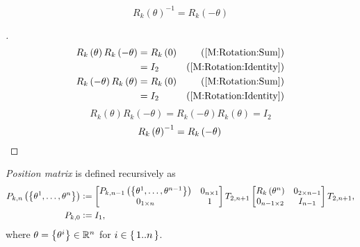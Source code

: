 \documentclass[../main.tex]{subfiles}
\begin{document}
\begin{corollary}\label{M:Rotation:Inverse}
    \begin{equation*}
        R_k\left(\theta\right)^{-1} = R_k\left(-\theta\right)
    \end{equation*}
\end{corollary}
\begin{proof}[]
    \begin{align*}
        R_k\left(\theta\right)R_k\left(-\theta\right)
         & = R_k\left(0\right) & \text{(\cref{M:Rotation:Sum})}      \\
         & = I_2               & \text{(\cref{M:Rotation:Identity})} \\
        R_k\left(-\theta\right)R_k\left(\theta\right)
         & = R_k\left(0\right) & \text{(\cref{M:Rotation:Sum})}      \\
         & = I_2               & \text{(\cref{M:Rotation:Identity})}
    \end{align*}
    \begin{equation*}
        R_k\left(\theta\right)R_k\left(-\theta\right)
        = R_k\left(-\theta\right)R_k\left(\theta\right)
        = I_2
    \end{equation*}
    \begin{equation*}
        {R_k\left(\theta\right)}^{-1}
        =
        R_k\left(-\theta\right)
        \qedhere
    \end{equation*}
\end{proof}
\begin{definition}\label{M:Position}
    \textit{Position matrix} is defined recursively as
    \begin{align*}
        P_{k,n}\left(\left\{\tensor{\theta}{^1},\dots,\tensor{\theta}{^n}\right\}\right) & \defeq
        \begin{bmatrix}
            P_{k,n-1}\left(\left\{\tensor{\theta}{^1},\dots,\tensor{\theta}{^{n-1}}\right\}\right) & 0_{n\times 1} \\
            0_{1\times n}                                                                              & 1             \\
        \end{bmatrix}
        T_{2,n+1}
        \begin{bmatrix}
            R_k\left(\tensor{\theta}{^n}\right) & 0_{{2}\times{n-1}} \\
            0_{{n-1}\times{2}}                  & {I}_{n-1}          \\
        \end{bmatrix}
        T_{2,n+1} \text{,}                                                                                    \\
        P_{k,0}                                                                          & \defeq I_1\text{,}
    \end{align*}
    where $\theta=\left\{\tensor{\theta}{^i}\right\}\in\R^n$ for $i\in\set{1..n}$.
\end{definition}
\end{document}
